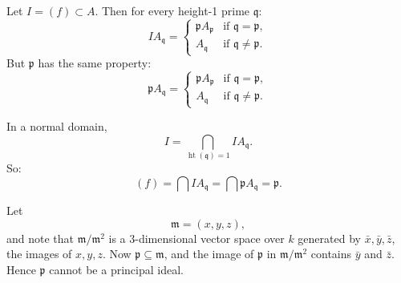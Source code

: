\documentclass[12pt]{article}
\begin{document}
\begin{example}
    Let $I=(f)\subset A$. Then for every height-1 prime $\mathfrak q$:
    \[
        IA_{\mathfrak q} =
        \begin{cases}
            \mathfrak p A_{\mathfrak p} & \text{if } \mathfrak q=\mathfrak p,     \\
            A_{\mathfrak q}             & \text{if } \mathfrak q\neq \mathfrak p.
        \end{cases}
    \]
    But $\mathfrak p$ has the same property:
    \[
        \mathfrak p A_{\mathfrak q} =
        \begin{cases}
            \mathfrak p A_{\mathfrak p} & \text{if } \mathfrak q=\mathfrak p,     \\
            A_{\mathfrak q}             & \text{if } \mathfrak q\neq \mathfrak p.
        \end{cases}
    \]

    In a normal domain,
    \[
        I = \bigcap_{\operatorname{ht}(\mathfrak q)=1} IA_{\mathfrak q}.
    \]
    So:
    \[
        (f) = \bigcap IA_{\mathfrak q} = \bigcap \mathfrak p A_{\mathfrak q} = \mathfrak p.
    \]

    Let
    \[
        \mathfrak m=(x,y,z),
    \]
    and note that $\mathfrak m/\mathfrak m^2$
    is a \(3\)-dimensional vector space over \(k\) generated by \(\bar x,\bar y,\bar z\), the images of \(x,y,z\). Now \(\mathfrak p\subseteq \mathfrak m\), and the image of \(\mathfrak p\) in \(\mathfrak m/\mathfrak m^2\) contains \(\bar y\) and \(\bar z\). Hence \(\mathfrak p\) cannot be a principal ideal.
\end{example}
\end{document}
